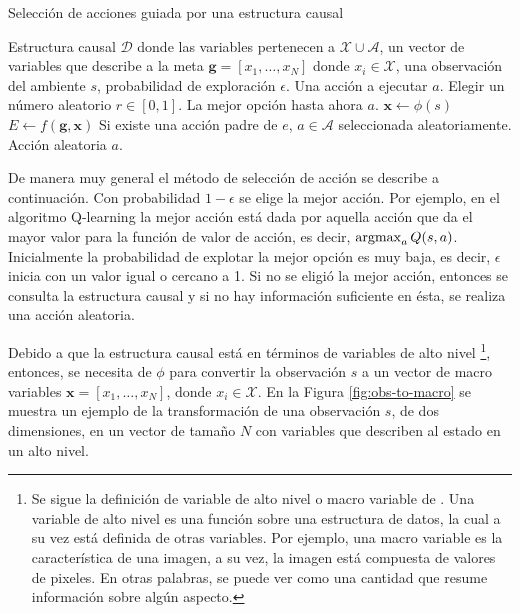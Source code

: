 \begin{mialgoritmo}
  \caption{Selección de acciones guiada por una estructura causal \label{alg:guided-action-selection}}
  \begin{algorithmic}[1]
  \REQUIRE Estructura causal $\mathcal{D}$ donde las variables pertenecen a $\mathcal{X} \cup \mathcal{A}$, un vector de variables
  que describe a la meta $\mathbf{g} = [x_1, \dots, x_N]$ donde $x_i \in \mathcal{X}$, una observación del ambiente $s$, probabilidad de exploración $\epsilon$.
  \ENSURE Una acción a ejecutar $a$.
  \STATE Elegir un número aleatorio $r \in [0, 1]$.
    \RETURN La mejor opción hasta ahora $a$.
   \ENDIF
  \STATE $\mathbf{x} \leftarrow \phi(s)$ 
   \STATE $E \leftarrow f(\mathbf{g}, \mathbf{x})$ 
        \RETURN Si existe una acción padre de $e$, $a \in \mathcal{A}$ seleccionada aleatoriamente. 
    \ENDFOR
    \RETURN Acción aleatoria $a$.
  \end{algorithmic}
\end{mialgoritmo}



De manera muy general el método de selección de acción se describe a continuación. 
Con probabilidad $1-\epsilon$ se elige la mejor acción. Por ejemplo, en el algoritmo Q-learning la mejor acción está dada por aquella acción que da el mayor valor para la función de valor de acción, es decir,  $\operatorname*{argmax}_a Q(s, a)$.
Inicialmente la probabilidad de
explotar la mejor opción es muy baja, es decir, $\epsilon$ inicia con un valor igual o cercano a 1.
Si no se eligió la mejor acción, entonces se consulta la estructura causal y si no hay información suficiente en ésta, se realiza una acción aleatoria.


Debido a que la estructura causal está en términos de variables de alto nivel \footnote{Se sigue la definición de variable de alto nivel o macro variable de \citet{chalupka2014visual}. Una variable de alto nivel es
una función sobre una estructura de datos, la cual a su vez está definida de otras 
variables. Por ejemplo, una macro variable es la característica de una imagen,
a su vez, la imagen está compuesta de valores de pixeles. En otras palabras, 
se puede ver como una cantidad que resume información sobre algún aspecto.},
entonces, se necesita de $\phi$ para  convertir la observación $s$ a un vector de macro variables $\mathbf{x} = [x_1, \dots, x_N]$, donde $x_i \in \mathcal{X}$. En la Figura \ref{fig:obs-to-macro} se muestra un ejemplo de la transformación de una observación $s$, de dos dimensiones, en un vector de tamaño $N$ con variables que describen al estado en un alto nivel.

